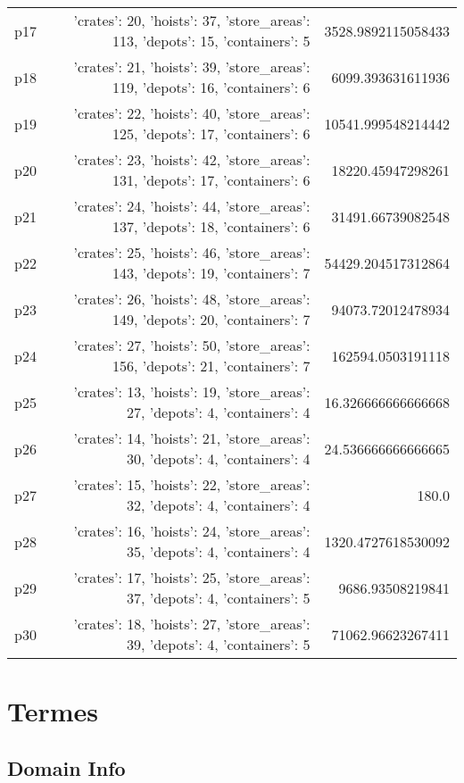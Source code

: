 \documentclass{article}
\begin{document}
\begin{center}
\begin{tabular}{r|r|r}
  p17&{'crates': 20, 'hoists': 37, 'store\_areas': 113, 'depots': 15, 'containers': 5}&3528.9892115058433\\
  p18&{'crates': 21, 'hoists': 39, 'store\_areas': 119, 'depots': 16, 'containers': 6}&6099.393631611936\\
  p19&{'crates': 22, 'hoists': 40, 'store\_areas': 125, 'depots': 17, 'containers': 6}&10541.999548214442\\
  p20&{'crates': 23, 'hoists': 42, 'store\_areas': 131, 'depots': 17, 'containers': 6}&18220.45947298261\\
  p21&{'crates': 24, 'hoists': 44, 'store\_areas': 137, 'depots': 18, 'containers': 6}&31491.66739082548\\
  p22&{'crates': 25, 'hoists': 46, 'store\_areas': 143, 'depots': 19, 'containers': 7}&54429.204517312864\\
  p23&{'crates': 26, 'hoists': 48, 'store\_areas': 149, 'depots': 20, 'containers': 7}&94073.72012478934\\
  p24&{'crates': 27, 'hoists': 50, 'store\_areas': 156, 'depots': 21, 'containers': 7}&162594.0503191118\\
  p25&{'crates': 13, 'hoists': 19, 'store\_areas': 27, 'depots': 4, 'containers': 4}&16.326666666666668\\
  p26&{'crates': 14, 'hoists': 21, 'store\_areas': 30, 'depots': 4, 'containers': 4}&24.536666666666665\\
  p27&{'crates': 15, 'hoists': 22, 'store\_areas': 32, 'depots': 4, 'containers': 4}&180.0\\
  p28&{'crates': 16, 'hoists': 24, 'store\_areas': 35, 'depots': 4, 'containers': 4}&1320.4727618530092\\
  p29&{'crates': 17, 'hoists': 25, 'store\_areas': 37, 'depots': 4, 'containers': 5}&9686.93508219841\\
  p30&{'crates': 18, 'hoists': 27, 'store\_areas': 39, 'depots': 4, 'containers': 5}&71062.96623267411
                            \end{tabular}
                            \end{center}
                    
                            \newpage \section{Termes}
                    \subsection*{Domain Info}
\end{document}
